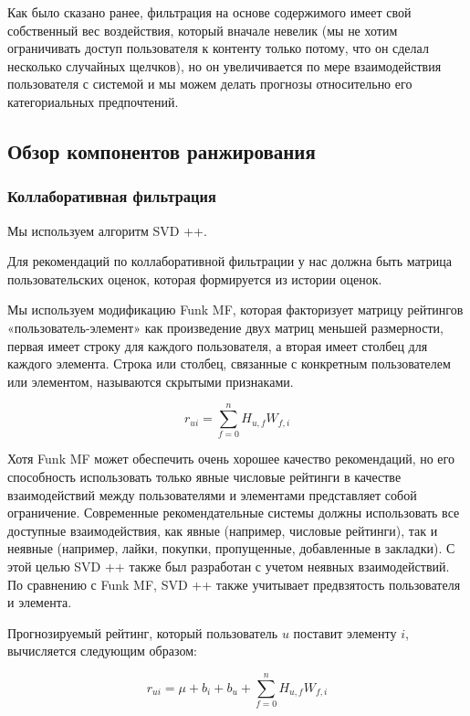 \documentclass[14pt]{matmex-diploma-custom}
\begin{document}
Как было сказано ранее, фильтрация на основе содержимого имеет свой собственный вес воздействия, который вначале невелик (мы не хотим ограничивать доступ пользователя к контенту только потому, что он сделал несколько случайных щелчков), но он увеличивается по мере взаимодействия пользователя с системой и мы можем делать прогнозы относительно его категориальных предпочтений.


\subsection{Обзор компонентов ранжирования}


\subsubsection{Коллаборативная фильтрация}

Мы используем алгоритм SVD ++.

Для рекомендаций по коллаборативной фильтрации у нас должна быть матрица пользовательских оценок, которая формируется из истории оценок.

Мы используем модификацию Funk MF, которая факторизует матрицу рейтингов «пользователь-элемент» как произведение двух матриц меньшей размерности, первая имеет строку для каждого пользователя, а вторая имеет столбец для каждого элемента. Строка или столбец, связанные с конкретным пользователем или элементом, называются скрытыми признаками.

\begin{equation}
    r_{u i}=\sum_{f=0}^{n } H_{u, f} W_{f, i}
\end{equation}


Хотя Funk MF может обеспечить очень хорошее качество рекомендаций, но его способность использовать только явные числовые рейтинги в качестве взаимодействий между пользователями и элементами представляет собой ограничение. Современные рекомендательные системы должны использовать все доступные взаимодействия, как явные (например, числовые рейтинги), так и неявные (например, лайки, покупки, пропущенные, добавленные в закладки). С этой целью SVD ++ также был разработан с учетом неявных взаимодействий. По сравнению с Funk MF, SVD ++ также учитывает предвзятость пользователя и элемента.

Прогнозируемый рейтинг, который пользователь $ u $ поставит элементу $ i $, вычисляется следующим образом:

\begin{equation}
    r_{u i}=\mu+b_{i}+b_{u}+\sum_{f=0}^{n} H_{u, f} W_{f, i}
\end{equation}
\end{document}
